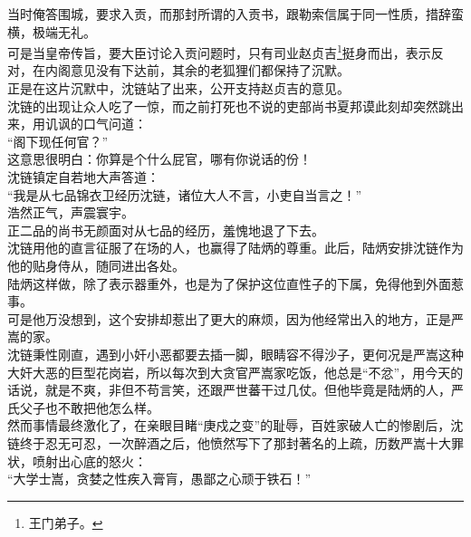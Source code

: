 \begin{multicols}{\theparacolNo}
当时俺答围城，要求入贡，而那封所谓的入贡书，跟勒索信属于同一性质，措辞蛮横，极端无礼。\\

可是当皇帝传旨，要大臣讨论入贡问题时，只有司业赵贞吉\footnote{王门弟子。}挺身而出，表示反对，在内阁意见没有下达前，其余的老狐狸们都保持了沉默。\\

正是在这片沉默中，沈链站了出来，公开支持赵贞吉的意见。\\

沈链的出现让众人吃了一惊，而之前打死也不说的吏部尚书夏邦谟此刻却突然跳出来，用讥讽的口气问道：\\

“阁下现任何官？”\\

这意思很明白：你算是个什么屁官，哪有你说话的份！\\

沈链镇定自若地大声答道：\\

“我是从七品锦衣卫经历沈链，诸位大人不言，小吏自当言之！”\\

浩然正气，声震寰宇。\\

正二品的尚书无颜面对从七品的经历，羞愧地退了下去。\\

沈链用他的直言征服了在场的人，也赢得了陆炳的尊重。此后，陆炳安排沈链作为他的贴身侍从，随同进出各处。\\

陆炳这样做，除了表示器重外，也是为了保护这位直性子的下属，免得他到外面惹事。\\

可是他万没想到，这个安排却惹出了更大的麻烦，因为他经常出入的地方，正是严嵩的家。\\

沈链秉性刚直，遇到小奸小恶都要去插一脚，眼睛容不得沙子，更何况是严嵩这种大奸大恶的巨型花岗岩，所以每次到大贪官严嵩家吃饭，他总是“不忿”，用今天的话说，就是不爽，非但不苟言笑，还跟严世蕃干过几仗。但他毕竟是陆炳的人，严氏父子也不敢把他怎么样。\\

然而事情最终激化了，在亲眼目睹“庚戍之变”的耻辱，百姓家破人亡的惨剧后，沈链终于忍无可忍，一次醉酒之后，他愤然写下了那封著名的上疏，历数严嵩十大罪状，喷射出心底的怒火：\\

“大学士嵩，贪婪之性疾入膏肓，愚鄙之心顽于铁石！”\\


\end{multicols}
